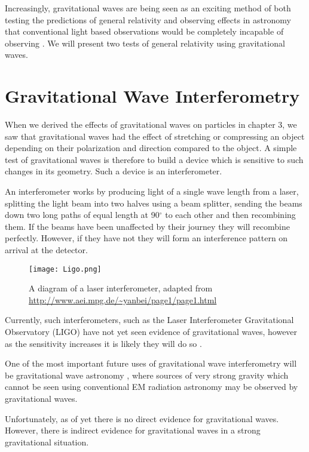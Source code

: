 
Increasingly, gravitational waves are being seen as an exciting method of both testing the predictions of general relativity \cite{lrr-2006-3} and observing effects in astronomy that conventional light based observations would be completely incapable of observing \cite{lrr-2011-1}. We will present two tests of general relativity using gravitational waves.

\section{Gravitational Wave Interferometry}

When we derived the effects of gravitational waves on particles in chapter 3, we saw that gravitational waves had the effect of stretching or compressing an object depending on their polarization and direction compared to the object. A simple test of gravitational waves is therefore to build a device which is sensitive to such changes in its geometry. Such a device is an interferometer.

An interferometer works by producing light of a single wave length from a laser, splitting the light beam into two halves using a beam splitter, sending the beams down two long paths of equal length at 90\(^{\circ}\) to each other and then recombining them. If the beams have been unaffected by their journey they will recombine perfectly. However, if they have not they will form an interference pattern on arrival at the detector.

\begin{figure}[h]
	\centering
	\texttt{[image: Ligo.png]}
	\caption{A diagram of a laser interferometer, adapted from \url{http://www.aei.mpg.de/\~yanbei/page1/page1.html}}
\end{figure}

Currently, such interferometers, such as the Laser Interferometer Gravitational Observatory (LIGO) have not yet seen evidence of gravitational waves, however as the sensitivity increases it is likely they will do so \cite{lrr-2006-3}.

One of the most important future uses of gravitational wave interferometry will be gravitational wave astronomy \cite{lrr-2009-2}, where sources of very strong gravity which cannot be seen using conventional EM radiation astronomy may be observed by gravitational waves.

Unfortunately, as of yet there is no direct evidence for gravitational waves. However, there is indirect evidence for gravitational waves in a strong gravitational situation.

